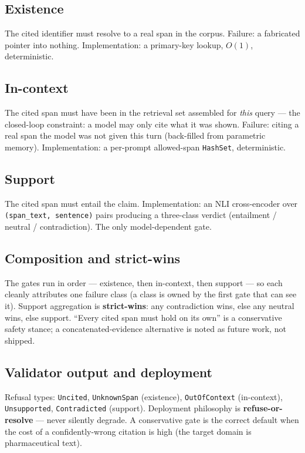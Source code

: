 \subsection{Existence}
The cited identifier must resolve to a real span in the corpus.
Failure: a fabricated pointer into nothing. Implementation: a
primary-key lookup, $O(1)$, deterministic.

\subsection{In-context}
The cited span must have been in the retrieval set assembled for
\emph{this} query --- the closed-loop constraint: a model may only
cite what it was shown. Failure: citing a real span the model was not
given this turn (back-filled from parametric memory). Implementation:
a per-prompt allowed-span \texttt{HashSet}, deterministic.

\subsection{Support}
The cited span must entail the claim. Implementation: an NLI
cross-encoder over \texttt{(span\_text, sentence)} pairs producing a
three-class verdict (entailment / neutral / contradiction). The only
model-dependent gate.

\subsection{Composition and strict-wins}
The gates run in order --- existence, then in-context, then
support --- so each cleanly attributes one failure class (a class is
owned by the first gate that can see it). Support aggregation is
\textbf{strict-wins}: any contradiction wins, else any neutral wins,
else support. ``Every cited span must hold on its own'' is a
conservative safety stance; a concatenated-evidence alternative is
noted as future work, not shipped.

\subsection{Validator output and deployment}
Refusal types: \texttt{Uncited}, \texttt{UnknownSpan} (existence),
\texttt{OutOfContext} (in-context), \texttt{Unsupported},
\texttt{Contradicted} (support). Deployment philosophy is
\textbf{refuse-or-resolve} --- never silently degrade. A conservative
gate is the correct default when the cost of a confidently-wrong
citation is high (the target domain is pharmaceutical text).

